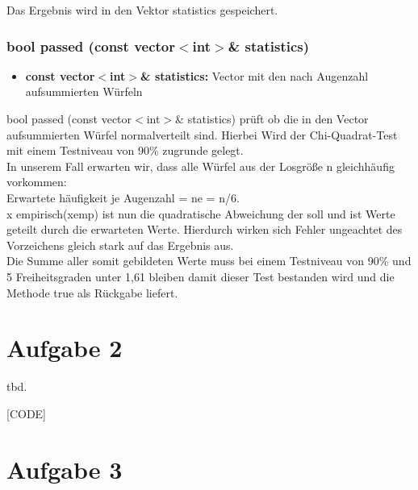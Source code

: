 \documentclass{../Vorlage/sebDenCls}
\begin{document}
Das Ergebnis wird in den Vektor statistics gespeichert.

\subsubsection{bool passed (const vector$<$int$>$\& statistics)}
\begin{itemize}
	\item \textbf{const vector$<$int$>$\& statistics:} Vector mit den nach Augenzahl aufsummierten Würfeln
\end{itemize}
bool passed (const vector$<$int$>$\& statistics) prüft ob die in den Vector aufsummierten Würfel normalverteilt sind. Hierbei Wird der Chi-Quadrat-Test mit einem Testniveau von 90\% zugrunde gelegt. \\

In unserem Fall erwarten wir, dass alle Würfel aus der Losgröße n gleichhäufig vorkommen:\\ 
Erwartete häufigkeit je Augenzahl = ne = n/6.\\

x empirisch(xemp) ist nun die quadratische Abweichung der soll und ist Werte geteilt durch die erwarteten Werte. Hierdurch wirken sich Fehler ungeachtet des Vorzeichens gleich stark auf das Ergebnis aus. \\

Die Summe aller somit gebildeten Werte muss bei einem Testniveau von 90\% und 5 Freiheitsgraden unter 1,61 bleiben damit dieser Test bestanden wird und die Methode true als Rückgabe liefert.

\section*{Aufgabe 2}

tbd.

[CODE]

\section*{Aufgabe 3}
\end{document}
